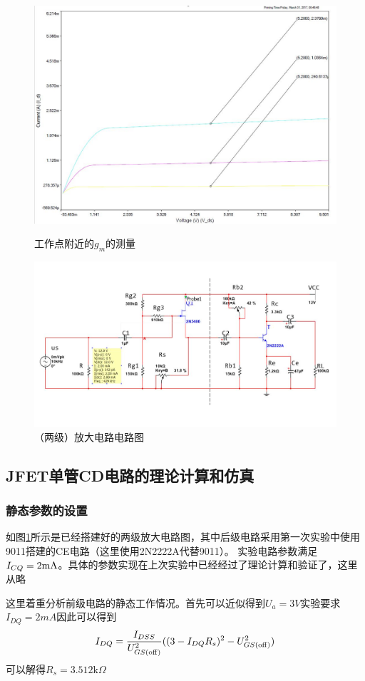 \documentclass[UTF8,a4paper]{ctexart}
\begin{document}
\begin{figure}
\centering
\includegraphics[width=\textwidth]{gm.jpg}
\caption{工作点附近的$g_m$的测量}
\label{micro}
\includegraphics [width=\textwidth]{vII.jpg}
\caption{（两级）放大电路电路图}
\label{vi}
\end{figure}
\clearpage
\subsection{JFET单管CD电路的理论计算和仿真}
\subsubsection{静态参数的设置}
如图\ref{vi}所示是已经搭建好的两级放大电路图，其中后级电路采用第一次实验中使用9011搭建的CE电路（这里使用2N2222A代替9011）。
实验电路参数满足$I_{CQ}=2\rm{mA}$。具体的参数实现在上次实验中已经经过了理论计算和验证了，这里从略

这里着重分析前级电路的静态工作情况。首先可以近似得到$U_a=3V$实验要求$I_{DQ}=2mA$因此可以得到$$I_{DQ}=\frac{I_{DSS}}{U_{GS(\rm{off})}^2}((3-I_{DQ}R_s)^2-U_{GS(\rm{off})}^2)$$
可以解得$R_s=3.512\mathrm{k}\Omega$
\end{document}
